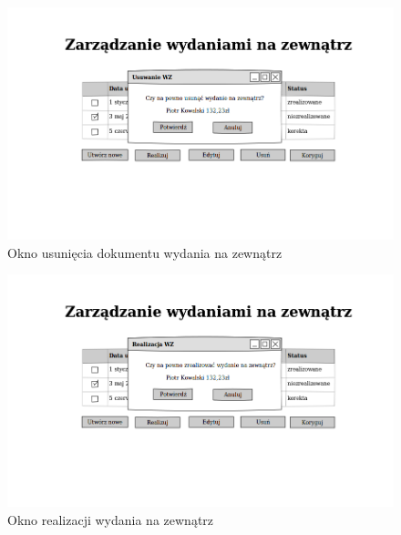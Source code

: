 \begin{figure}[!htb]
  \begin{center}
    \includegraphics[scale=0.45]{../img/interfejs/usuniecie-wydania-na-zewnatrz.png}
  \end{center}
  \caption{Okno usunięcia dokumentu wydania na zewnątrz}
\end{figure}
\FloatBarrier

\begin{figure}[!htb]
  \begin{center}
    \includegraphics[scale=0.45]{../img/interfejs/realizacja-wydania-na-zewnatrz.png}
  \end{center}
  \caption{Okno realizacji wydania na zewnątrz}
\end{figure}
\FloatBarrier

